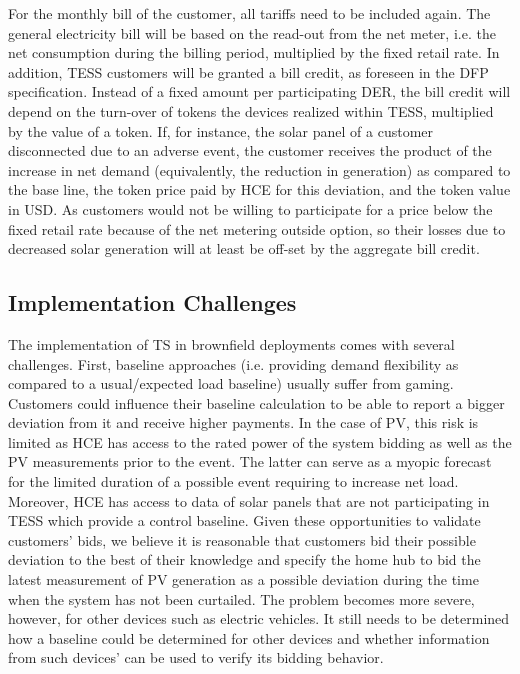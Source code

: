 For the monthly bill of the customer, all tariffs need to be included again. The general electricity bill will be based on the read-out from the net meter, i.e. the net consumption during the billing period, multiplied by the fixed retail rate. In addition, TESS customers will be granted a bill credit, as foreseen in the DFP specification. Instead of a fixed amount per participating DER, the bill credit will depend on the turn-over of tokens the devices realized within TESS, multiplied by the value of a token. If, for instance, the solar panel of a customer disconnected due to an adverse event, the customer receives the product of the increase in net demand (equivalently, the reduction in generation) as compared to the base line, the token price paid by HCE for this deviation, and the token value in USD. As customers would not be willing to participate for a price below the fixed retail rate because of the net metering outside option, so their losses due to decreased solar generation will at least be off-set by the aggregate bill credit.

\subsection{Implementation Challenges}\label{sec:impl_challenges}

The implementation of TS in brownfield deployments comes with several challenges.
First, baseline approaches (i.e. providing demand flexibility as compared to a usual/expected load baseline) usually suffer from gaming. Customers could influence their baseline calculation to be able to report a bigger deviation from it and receive higher payments. In the case of PV, this risk is limited as HCE has access to the rated power of the system bidding as well as the PV measurements prior to the event. The latter can serve as a myopic forecast for the limited duration of a possible event requiring to increase net load. Moreover, HCE has access to data of solar panels that are not participating in TESS which provide a control baseline. Given these opportunities to validate customers' bids, we believe it is reasonable that customers bid their possible deviation to the best of their knowledge and specify the home hub to bid the latest measurement of PV generation as a possible deviation during the time when the system has not been curtailed. 
The problem becomes more severe, however, for other devices such as electric vehicles. It still needs to be determined how a baseline could be determined for other devices and whether information from such devices'  can be used to verify its bidding behavior.

